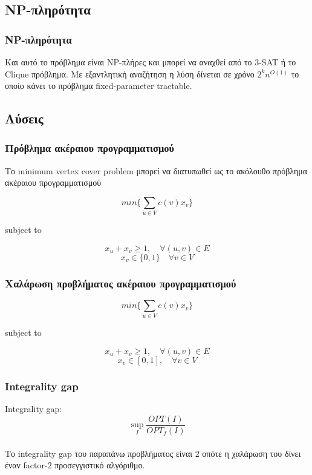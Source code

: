 \documentclass[greek]{beamer}
\begin{document}

\subsection{NP-πληρότητα}


\begin{frame}
\frametitle{NP-πληρότητα}
Και αυτό το πρόβλημα είναι NP-πλήρες και μπορεί να αναχθεί από το 3-SAT ή το Clique πρόβλημα.
Με εξαντλητική αναζήτηση η λύση δίνεται σε χρόνο $2^{k}n^{O(1)}$ το οποίο κάνει το πρόβλημα fixed-parameter tractable.
\end{frame}


\subsection{Λύσεις}


\begin{frame}
\frametitle{Πρόβλημα ακέραιου προγραμματισμού}
Το minimum vertex cover problem μπορεί να διατυπωθεί ως το ακόλουθο πρόβλημα ακέραιου προγραμματισμού

$$min\{\displaystyle\sum_{u\in{V}} c(v)x_v\}$$ 
\centerline{subject to}
$$x_u + x_v \geq{1}, \quad \forall (u, v) \in{E}$$
$$ x_v \in{\{0, 1\}} \quad \forall v \in{V}$$
\end{frame}


\begin{frame}
\frametitle{Χαλάρωση προβλήματος ακέραιου προγραμματισμού}

$$min\{\displaystyle\sum_{u\in{V}} c(v)x_v\}$$ 
\centerline{subject to}
$$x_u + x_v \geq{1}, \quad \forall (u, v) \in{E}$$
$$ x_v \in [0,1], \quad \forall v \in{V}$$
\end{frame}


\begin{frame}
\frametitle{Integrality gap}
Integrality gap:
$$\sup_{I} \frac{OPT(I)}{OPT_f(I)}$$\\

Το integrality gap του παραπάνω προβλήματος είναι $2$ οπότε η χαλάρωση του δίνει έναν factor-$2$ προσεγγιστικό αλγόριθμο. 
\end{frame}
\end{document}

